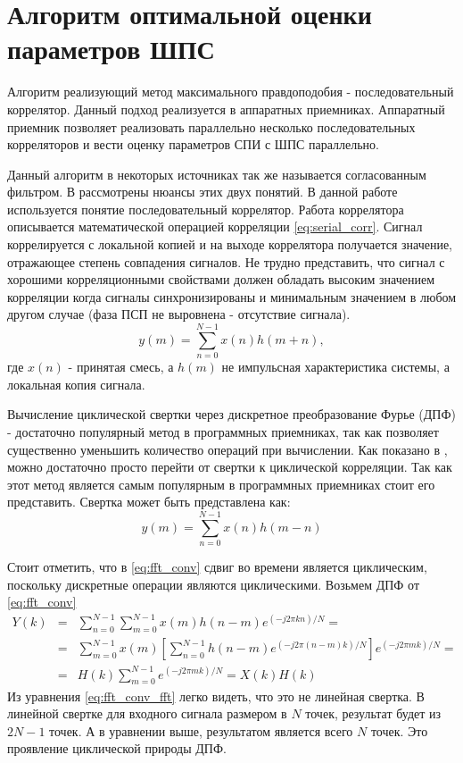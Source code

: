 \section{Алгоритм оптимальной оценки параметров ШПС}
Алгоритм реализующий метод максимального правдоподобия - последовательный коррелятор. Данный подход реализуется в аппаратных приемниках.
Аппаратный приемник позволяет реализовать параллельно несколько последовательных корреляторов и вести оценку параметров
СПИ с ШПС параллельно.

Данный алгоритм в некоторых источниках так же называется согласованным фильтром. В \cite{sklyar} рассмотрены нюансы этих двух понятий.
В данной работе используется понятие последовательный коррелятор. Работа коррелятора описывается математической операцией
корреляции \ref{eq:serial_corr}. Сигнал коррелируется с локальной копией и на выходе коррелятора получается значение, отражающее
степень совпадения сигналов. Не трудно представить, что сигнал с хорошими корреляционными свойствами должен обладать высоким значением
корреляции когда сигналы синхронизированы и минимальным значением в любом другом случае (фаза ПСП не выровнена - отсутствие сигнала).
\begin{equation}
	\label{eq:serial_corr}
	y(m)=\sum\limits_{n=0}^{N-1}{x(n)h(m+n)},
\end{equation}
где ${x(n)}$ - принятая смесь, а ${h(m)}$ не импульсная характеристика системы, а локальная копия сигнала.


Вычисление циклической свертки через дискретное преобразование Фурье (ДПФ) - достаточно популярный метод
в программных приемниках, так как позволяет существенно уменьшить количество операций при вычислении. Как показано
в \cite{tsui, oppenheim}, можно достаточно просто перейти от свертки к циклической корреляции. Так как этот метод является самым
популярным в программных приемниках стоит его представить.
Свертка может быть представлена как:
\begin{equation}
	\label{eq:fft_conv}
	y(m)=\sum\limits_{n=0}^{N-1}{x(n)h(m-n)}
\end{equation}

Стоит отметить, что в \ref{eq:fft_conv} сдвиг во времени является циклическим, поскольку дискретные операции являются циклическими.
Возьмем ДПФ от \ref{eq:fft_conv}
\begin{eqnarray}
	\label{eq:fft_conv_fft}
	Y(k) & = & \sum\limits_{n=0}^{N-1}\sum\limits_{m=0}^{N-1}{x(m)h(n-m)e^{(-j2\pi{kn})/N}}=\nonumber \\
	& = & \sum\limits_{m=0}^{N-1}{x(m)}[\sum\limits_{n=0}^{N-1}h(n-m)e^{(-j2\pi{(n-m)}k)/N}]e^{(-j2\pi{m}k)/N}=\\
	& = & H(k)\sum\limits_{m=0}^{N-1}e^{(-j2\pi{m}k)/N} = X(k)H(k)\nonumber 
\end{eqnarray}
Из уравнения \ref{eq:fft_conv_fft} легко видеть, что это не линейная свертка. В линейной свертке для входного сигнала размером в ${N}$ точек,
результат будет из ${2N-1}$ точек. А в уравнении выше, результатом является всего ${N}$ точек.
Это проявление циклической природы ДПФ.

